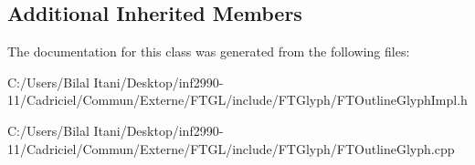 \subsection*{Additional Inherited Members}


The documentation for this class was generated from the following files\+:\begin{DoxyCompactItemize}
\item 
C\+:/\+Users/\+Bilal Itani/\+Desktop/inf2990-\/11/\+Cadriciel/\+Commun/\+Externe/\+F\+T\+G\+L/include/\+F\+T\+Glyph/F\+T\+Outline\+Glyph\+Impl.\+h\item 
C\+:/\+Users/\+Bilal Itani/\+Desktop/inf2990-\/11/\+Cadriciel/\+Commun/\+Externe/\+F\+T\+G\+L/include/\+F\+T\+Glyph/F\+T\+Outline\+Glyph.\+cpp\end{DoxyCompactItemize}
